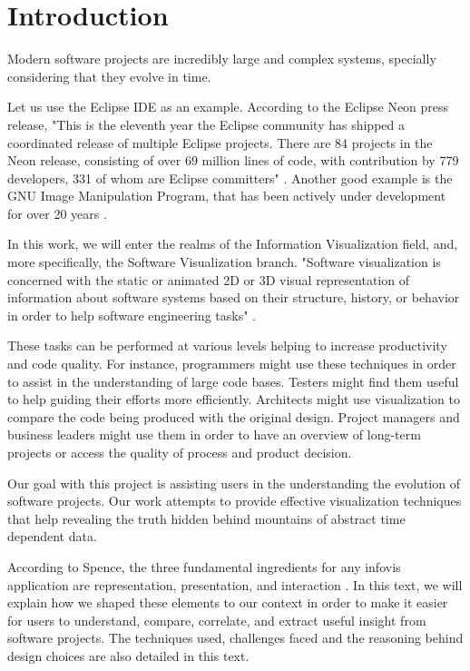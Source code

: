 \chapter{Introduction}
Modern software projects are incredibly large and complex systems, specially considering that they evolve in time.

Let us use the Eclipse IDE as an example. According to the Eclipse Neon press release, "This is the eleventh year the Eclipse community has shipped a coordinated release of multiple Eclipse projects. There are 84 projects in the Neon release, consisting of over 69 million lines of code, with contribution by 779 developers, 331 of whom are Eclipse committers" \cite{ref:eclipse}.
Another good example is the GNU Image Manipulation Program, that has been actively under development for over 20 years \cite{ref:gimp}.

In this work, we will enter the realms of the Information Visualization field, and, more specifically, the Software Visualization branch. "Software visualization is concerned with the static or animated 2D or 3D visual representation of information about software systems based on their structure, history, or behavior in order to help software engineering tasks" \cite{reg:diehl07}.

These tasks can be performed at various levels helping to increase productivity and code quality. For instance, programmers might use these techniques in order to assist in the understanding of large code bases. Testers might find them useful to help guiding their efforts more efficiently. Architects might use visualization to compare the code being produced with the original design. Project managers and business leaders might use them in order to have an overview of long-term projects or access the quality of process and product decision.

Our goal with this project is assisting users in the understanding the evolution of software projects. Our work attempts to provide effective visualization techniques that help revealing the truth hidden behind mountains of abstract time dependent data.

According to Spence, the three fundamental ingredients for any infovis application are representation, presentation, and interaction \cite{ref:spence07}. In this text, we will explain how we shaped these elements to our context in order to make it easier for users to understand, compare, correlate, and extract useful insight from software projects. The techniques used, challenges faced and the reasoning behind design choices are also detailed in this text.

